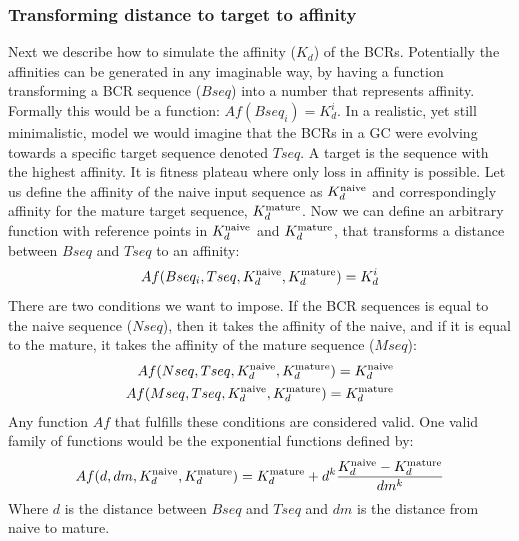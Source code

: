 \subsubsection{Transforming distance to target to affinity}
Next we describe how to simulate the affinity ($K_d$) of the BCRs.
Potentially the affinities can be generated in any imaginable way, by having a function transforming a BCR sequence ($Bseq$) into a number that represents affinity.
Formally this would be a function: $Af(Bseq_i) = K^i_d$.
In a realistic, yet still minimalistic, model we would imagine that the BCRs in a GC were evolving towards a specific target sequence denoted $Tseq$.
A target is the sequence with the highest affinity.
It is fitness plateau where only loss in affinity is possible.
Let us define the affinity of the naive input sequence as $K^{\text{naive}}_d$ and correspondingly affinity for the mature target sequence, $K^{\text{mature}}_d$.
Now we can define an arbitrary function with reference points in $K^{\text{naive}}_d$ and $K^{\text{mature}}_d$, that transforms a distance between $Bseq$ and $Tseq$ to an affinity:
$$
Af(Bseq_i, Tseq, K^{\text{naive}}_d, K^{\text{mature}}_d) = K^i_d
$$
There are two conditions we want to impose.
If the BCR sequences is equal to the naive sequence ($Nseq$), then it takes the affinity of the naive, and if it is equal to the mature, it takes the affinity of the mature sequence ($Mseq$):
\begin{equation}
\begin{split}
Af(Nseq, Tseq, K^{\text{naive}}_d, K^{\text{mature}}_d) = K^{\text{naive}}_d \\
Af(Mseq, Tseq, K^{\text{naive}}_d, K^{\text{mature}}_d) = K^{\text{mature}}_d
\end{split}
\label{eq:hd2affy_cond}
\end{equation}
Any function $Af$ that fulfills these conditions are considered valid.
One valid family of functions would be the exponential functions defined by:
\begin{equation}
Af(d, dm, K^{\text{naive}}_d, K^{\text{mature}}_d) = K^{\text{mature}}_d + d^k \frac{K^{\text{naive}}_d - K^{\text{mature}}_d}{dm^k}
\label{eq:hd2affy}
\end{equation}
Where $d$ is the distance between $Bseq$ and $Tseq$ and $dm$ is the distance from naive to mature.
